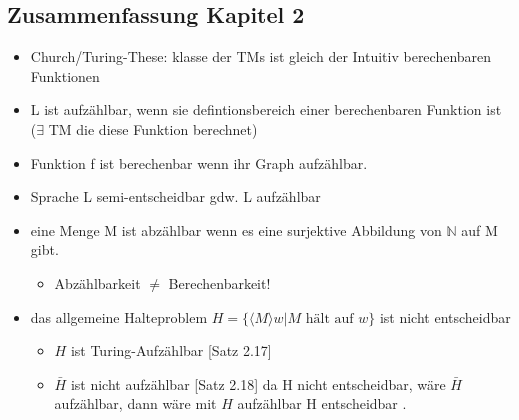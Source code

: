 \documentclass[a4paper, 10pt]{article}
\theoremstyle{definition}
\newcommand{\goedl}[1]{\langle {#1}\rangle}
\begin{document}
\subsection{Zusammenfassung Kapitel 2}
\begin{itemize}
    \item Church/Turing-These: klasse der TMs ist gleich der Intuitiv berechenbaren Funktionen
    \item L ist aufzählbar, wenn sie defintionsbereich einer berechenbaren Funktion ist ($\exists$ TM die diese Funktion berechnet)
    \item Funktion f ist berechenbar wenn ihr Graph aufzählbar.
    \item Sprache L semi-entscheidbar gdw. L aufzählbar
    \item eine Menge M ist abzählbar wenn es eine surjektive Abbildung von $\mathbb{N}$ auf M gibt.\begin{itemize}
        \item Abzählbarkeit $\neq$ Berechenbarkeit!
    \end{itemize}
    \item das allgemeine Halteproblem $H=\{\goedl{M}w|M\text{ hält auf }w\}$ ist nicht entscheidbar\begin{itemize}
        \item $H$ ist Turing-Aufzählbar [Satz 2.17]
        \item $\bar{H}$ ist nicht aufzählbar [Satz 2.18] da H nicht entscheidbar, wäre $\bar{H}$ aufzählbar, dann wäre mit $H$ aufzählbar H entscheidbar \Lightning.
    \end{itemize}
\end{itemize}
\end{document}
